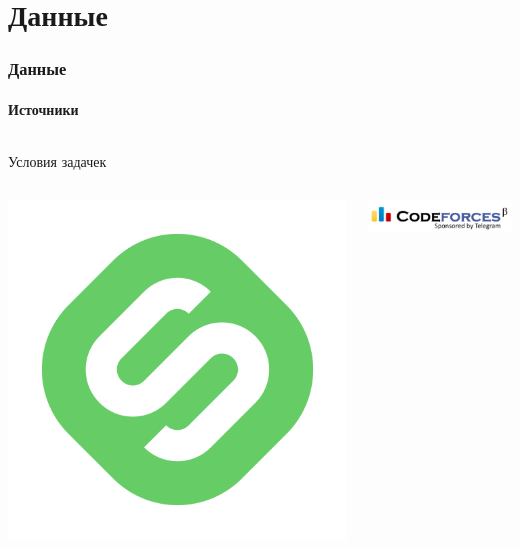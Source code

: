 \documentclass[10pt]{beamer}
\begin{document}
\section{Данные}
\begin{frame}
\frametitle{Данные}
\framesubtitle{Источники}

\begin{columns}[T]
    \begin{column}[T]{0.33\textwidth}
        \begin{center}
            Условия задачек \\
            \begin{columns}
                \begin{column}{0.35\textwidth}
                    \begin{center}
                        \includegraphics[width=\textwidth]{images/stepik.png}
                    \end{center}
                \end{column}
                \begin{column}{0.65\textwidth}
                    \begin{center}
                        \includegraphics[width=\textwidth]{images/codeforces.png} \\

\end{center}
\end{column}
\end{columns}
\end{center}
\end{column}
\end{columns}
\end{frame}
\end{document}
